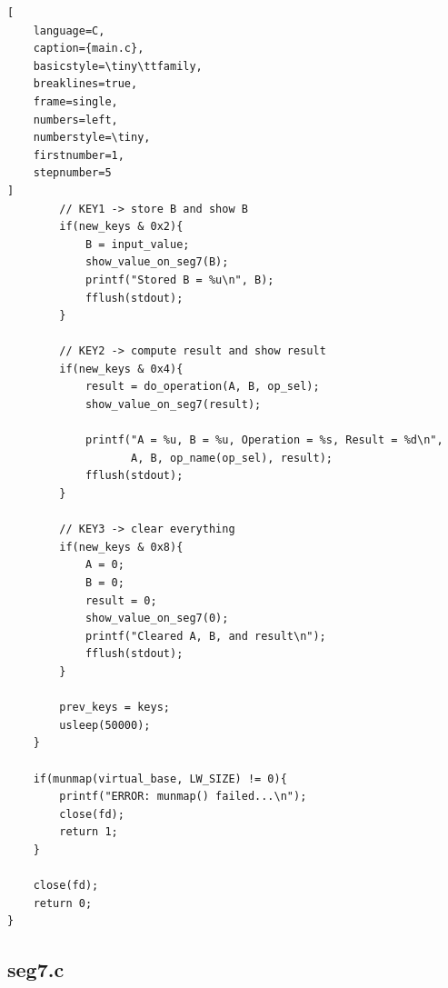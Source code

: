\documentclass[conference]{IEEEtran}
\begin{document}
\begin{lstlisting}[
    language=C, 
    caption={main.c}, 
    basicstyle=\tiny\ttfamily, 
    breaklines=true, 
    frame=single, 
    numbers=left, 
    numberstyle=\tiny, 
    firstnumber=1, 
    stepnumber=5
]
        // KEY1 -> store B and show B
        if(new_keys & 0x2){
            B = input_value;
            show_value_on_seg7(B);
            printf("Stored B = %u\n", B);
            fflush(stdout);
        }

        // KEY2 -> compute result and show result
        if(new_keys & 0x4){
            result = do_operation(A, B, op_sel);
            show_value_on_seg7(result);

            printf("A = %u, B = %u, Operation = %s, Result = %d\n",
                   A, B, op_name(op_sel), result);
            fflush(stdout);
        }

        // KEY3 -> clear everything
        if(new_keys & 0x8){
            A = 0;
            B = 0;
            result = 0;
            show_value_on_seg7(0);
            printf("Cleared A, B, and result\n");
            fflush(stdout);
        }

        prev_keys = keys;
        usleep(50000);
    }

    if(munmap(virtual_base, LW_SIZE) != 0){
        printf("ERROR: munmap() failed...\n");
        close(fd);
        return 1;
    }

    close(fd);
    return 0;
}

\end{lstlisting}

\subsection{seg7.c}
\end{document}
